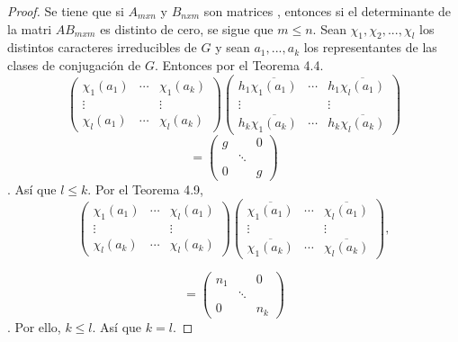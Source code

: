 \documentclass[12pt]{book}
\theoremstyle{definition}
\newcounter{in}
\begin{document}
\begin{proof}
  Se tiene que si $A_{mxn}$ y $B_{nxm}$ son matrices , entonces si el
  determinante de la matri $AB_{mxm}$ es distinto de cero, se sigue que $m \leq n$.
  Sean $\chi_{1}, \chi_{2},...,\chi_{l}$ los distintos caracteres irreducibles de $G$ y sean $a_{1},...,a_{k}$ los representantes de las clases de conjugación de $G$. Entonces por el Teorema 4.4.
\begin{equation*}
  \begin{pmatrix}
    \chi_{1}(a_{1}) & \cdots & \chi_{1}(a_{k}) \\ 
    \vdots &  & \vdots \\
    \chi_{l}(a_{1}) & \cdots & \chi_{l}(a_{k})
  \end{pmatrix}
  \begin{pmatrix}
    h_{1} \overline{\chi_{1}(a_{1})} & \cdots & h_{1} \overline{\chi_{l}(a_{1})} \\ 
    \vdots &  & \vdots \\
    h_{k} \overline{\chi_{1}(a_{k})} & \cdots & h_{k} \overline{\chi_{l}(a_{k})}  
  \end{pmatrix}
\end{equation*}
\begin{equation*}
  =
  \begin{pmatrix}
   g & & 0\\ 
     & \ddots & \\
     0 &  & g
  \end{pmatrix}   
  \end{equation*}.
  Así que $l \leq k$. Por el Teorema 4.9,
\begin{equation*}
  \begin{pmatrix}
    \chi_{1}(a_{1}) & \cdots & \chi_{l}(a_{1}) \\ 
    \vdots &  & \vdots \\
    \chi_{l}(a_{k}) & \cdots & \chi_{l}(a_{k})
  \end{pmatrix}
  \begin{pmatrix}
     \overline{\chi_{1}(a_{1})} & \cdots &  \overline{\chi_{l}(a_{1})} \\ 
    \vdots &  & \vdots \\
     \overline{\chi_{1}(a_{k})} & \cdots &  \overline{\chi_{l}(a_{k})}  
  \end{pmatrix},
\end{equation*}

\begin{equation*}
  =
  \begin{pmatrix}
   n_{1} & & 0\\ 
     & \ddots & \\
     0 &  & n_{k}
  \end{pmatrix}
\end{equation*}.
Por ello, $k \leq l$. Así que $k=l$.
\end{proof}
\end{document}
